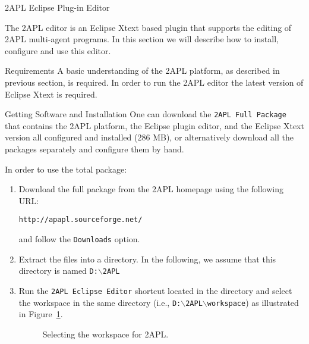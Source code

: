 \begin{chapter}{2APL Eclipse Plug-in Editor} \label{chap:eclipse}

The 2APL editor is an Eclipse Xtext based plugin that supports the
editing of 2APL multi-agent programs. In this section we will
describe how to install, configure and use this editor.

\begin{section}{Requirements}
A basic understanding of the 2APL platform, as described in previous
section, is required. In order to run the 2APL editor the latest
version of Eclipse Xtext is required.
\end{section}

\begin{section}{Getting Software and Installation}
One can download the {\tt 2APL Full Package} that contains the 2APL
platform, the Eclipse plug\-in editor, and the Eclipse Xtext version
all configured and installed (286 MB), or alternatively download all
the packages separately and configure them by hand.

In order to use the total package:
\begin{enumerate}

    \item Download the full package from the 2APL homepage using the
    following URL:
    \begin{center}
    {\tt http://apapl.sourceforge.net/}
    \end{center}
    and follow the {\tt Downloads} option.

    \item Extract the files into a directory. In the following, we assume that this directory is named \texttt{D:$\backslash$2APL}

    \item Run the \texttt{2APL Eclipse Editor} shortcut located in the
    directory and select the workspace in the same directory (i.e.,
    \texttt{D:$\backslash$2APL$\backslash$workspace}) as illustrated in
    Figure~\ref{fig:workspace}.
        \begin{figure}[ht]
            \begin{center}
            \end{center}
            \caption{Selecting the workspace for 2APL.}\label{fig:workspace}
        \end{figure}
\end{enumerate}


\end{section}
\end{chapter}
